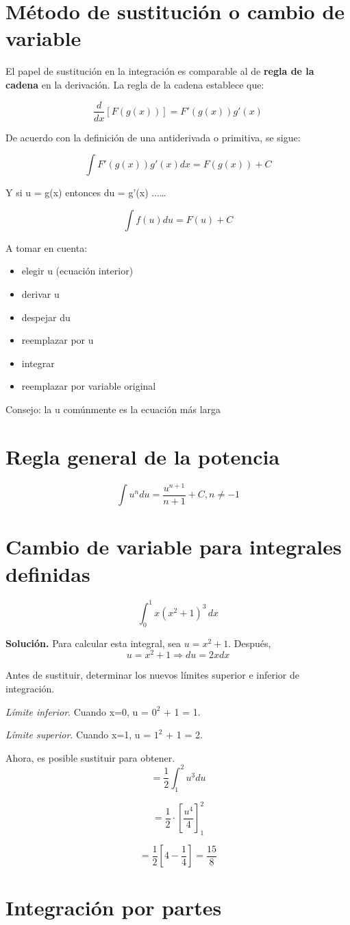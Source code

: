 \documentclass[letterpaper,12pt]{article}
\begin{document}
\begin{sloppypar}
\section{Método de sustitución o cambio de variable}
El papel de sustitución en la integración es comparable al de \textbf{regla de la cadena} en la derivación. La regla de la cadena establece que: 

$$\frac{d}{dx} [F(g(x))] = F'(g(x))g'(x)$$

De acuerdo con la definición de una antiderivada o primitiva, se sigue: 

$$\int F'(g(x))g'(x) dx = F(g(x)) + C$$

Y si u = g(x) entonces du = g'(x) ...\dots

$$\int f(u) du = F(u) + C$$

A tomar en cuenta:
\begin{itemize}
    \item elegir u (ecuación interior)
    \item derivar u 
    \item despejar du 
    \item reemplazar por u 
    \item integrar 
    \item reemplazar por variable original 
\end{itemize}

Consejo: la u comúnmente es la ecuación más larga 
\section{Regla general de la potencia}
$$\int u^{n} du = \displaystyle \frac{u^{n+1}}{n+1} + C, n\neq -1 $$

\section{Cambio de variable para integrales definidas}
$$\int_{0}^{1} x(x^2 + 1)^3\,dx $$

\textbf{Solución.} Para calcular esta integral, sea $u = x^2 + 1$. Después, 
$$u = x^2 + 1 \Longrightarrow du = 2x dx$$

Antes de sustituir, determinar los nuevos límites superior e inferior de integración.

\textit{Límite inferior}. Cuando x=0, u = $0^2$ + 1 = 1.

\textit{Límite superior}. Cuando x=1, u = $1^2$ + 1 = 2.

Ahora, es posible sustituir para obtener.
$$ = \frac{1}{2} \int_{1}^{2} u^3 du $$

$$ = \frac{1}{2} \cdot \left[\frac{u^4}{4}\right]_{1}^2 $$

$$ = \frac{1}{2} \left[ 4 - \frac{1}{4}\right] = \frac{15}{8}$$

\section{Integración por partes}



\end{sloppypar}
\end{document}
